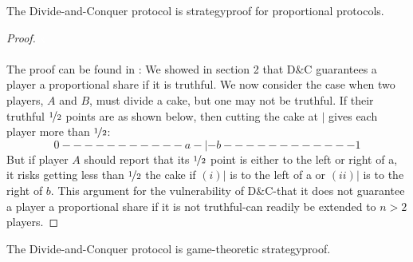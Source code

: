 \begin{lem}
The Divide-and-Conquer protocol is strategyproof for proportional protocols.
\end{lem}
\begin{proof} 
\textcolor{white}{x}\\\\
The proof can be found in \cite{dc}: We showed in section 2 that D$\&$C guarantees a player a proportional share 
if it is truthful.  We now consider the case when two players, $A$ and $B$, must divide a 
cake, but one may not be truthful.  If their truthful $\nicefrac{1}{2}$ points are as shown below, then 
cutting the cake at $|$ gives each player more than $\nicefrac{1}{2}$: 
$$0-----------a-|-b------------1$$ 
But if player $A$ should report that its $\nicefrac{1}{2}$ point is either to the left or right of a, it risks 
getting less than $\nicefrac{1}{2}$ the cake if $(i) |$ is to the left of a or $(ii) |$ is to the right of $b$.  This argument for the vulnerability of D$\&$C-that it does not guarantee a player a proportional 
share if it is not truthful-can readily be extended to $n > 2$ players.
\end{proof}
\begin{lem}
The Divide-and-Conquer protocol is game-theoretic strategyproof.
\end{lem}
\newpage

